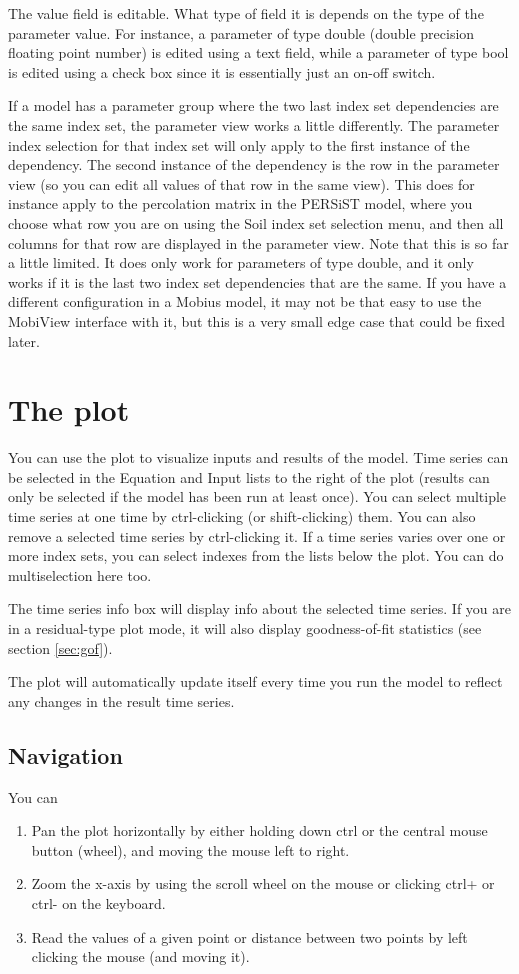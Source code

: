 \documentclass[11pt]{article}
\theoremstyle{definition}
\begin{document}
The value field is editable. What type of field it is depends on the type of the parameter value. For instance, a parameter of type double (double precision floating point number) is edited using a text field, while a parameter of type bool is edited using a check box since it is essentially just an on-off switch.

If a model has a parameter group where the two last index set dependencies are the same index set, the parameter view works a little differently. The parameter index selection for that index set will only apply to the first instance of the dependency. The second instance of the dependency is the row in the parameter view (so you can edit all values of that row in the same view). This does for instance apply to the percolation matrix in the PERSiST model, where you choose what row you are on using the Soil index set selection menu, and then all columns for that row are displayed in the parameter view. Note that this is so far a little limited. It does only work for parameters of type double, and it only works if it is the last two index set dependencies that are the same. If you have a different configuration in a Mobius model, it may not be that easy to use the MobiView interface with it, but this is a very small edge case that could be fixed later.

\section{The plot}

You can use the plot to visualize inputs and results of the model. Time series can be selected in the Equation and Input lists to the right of the plot (results can only be selected if the model has been run at least once). You can select multiple time series at one time by ctrl-clicking (or shift-clicking) them. You can also remove a selected time series by ctrl-clicking it. If a time series varies over one or more index sets, you can select indexes from the lists below the plot. You can do multiselection here too.

The time series info box will display info about the selected time series. If you are in a residual-type plot mode, it will also display goodness-of-fit statistics (see section \ref{sec:gof}).

The plot will automatically update itself every time you run the model to reflect any changes in the result time series.

\subsection{Navigation}
You can
\begin{enumerate}
\item Pan the plot horizontally by either holding down ctrl or the central mouse button (wheel), and moving the mouse left to right.
\item Zoom the x-axis by using the scroll wheel on the mouse or clicking ctrl+ or ctrl- on the keyboard.
\item Read the values of a given point or distance between two points by left clicking the mouse (and moving it).
\end{enumerate}
\end{document}
